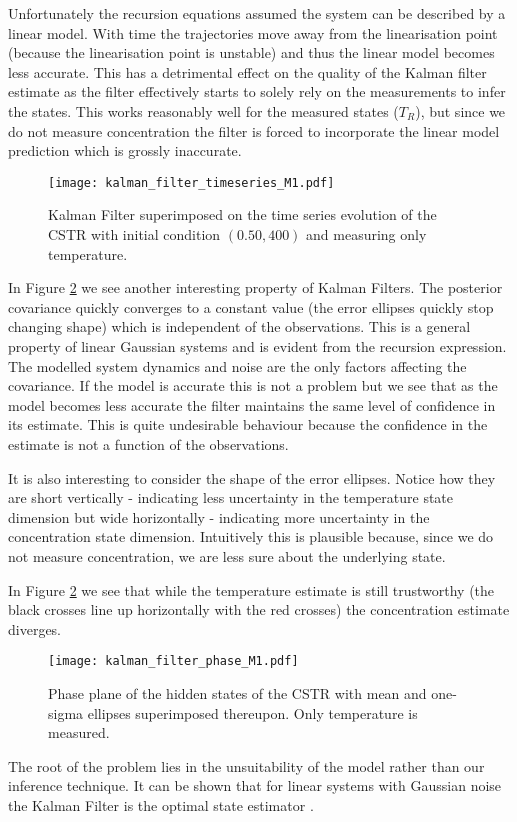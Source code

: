 Unfortunately the recursion equations assumed the system can be described by a linear model. With time the trajectories move away from the linearisation point (because the linearisation point is unstable) and thus the linear model becomes less accurate. This has a detrimental effect on the quality of the Kalman filter estimate as the filter effectively starts to solely rely on the measurements to infer the states. This works reasonably well for the measured states ($T_R$), but since we do not measure concentration the filter is forced to incorporate the linear model prediction which is grossly inaccurate. 
\begin{figure}[H] 
\centering
\texttt{[image: kalman\_filter\_timeseries\_M1.pdf]}
\caption{Kalman Filter superimposed on the time series evolution of the CSTR with initial condition $(0.50, 400)$ and measuring only temperature.}
\label{fig_kftimeseries}
\end{figure}
In Figure \ref{fig_kfphase} we see another interesting property of Kalman Filters. The posterior covariance quickly converges to a constant value (the error ellipses quickly stop changing shape) which is independent of the observations. This is a general property of linear Gaussian systems \cite{barber} and is evident from the recursion expression. The modelled system dynamics and noise are the only factors affecting the covariance. If the model is accurate this is not a problem but we see that as the model becomes less accurate the filter maintains the same level of confidence in its estimate. This is quite undesirable behaviour because the confidence in the estimate is not a function of the observations. 

It is also interesting to consider the shape of the error ellipses. Notice how they are short vertically - indicating less uncertainty in the temperature state dimension but wide horizontally - indicating more uncertainty in the concentration state dimension. Intuitively this is plausible because, since we do not measure concentration, we are less sure about the underlying state. 

In Figure \ref{fig_kfphase} we see that while the temperature estimate is still trustworthy (the black crosses line up horizontally with the red crosses) the concentration estimate diverges.
\begin{figure}[H] 
\centering
\texttt{[image: kalman\_filter\_phase\_M1.pdf]}
\caption{Phase plane of the hidden states of the CSTR with mean and one-sigma ellipses superimposed thereupon. Only temperature is measured.}
\label{fig_kfphase}
\end{figure}
The root of the problem lies in the unsuitability of the model rather than our inference technique. It can be shown that for linear systems with Gaussian noise the Kalman Filter is the optimal state estimator \cite{shalom}. 

